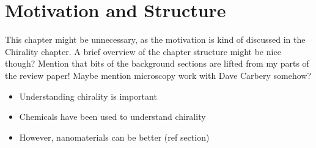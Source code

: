 \chapter{Motivation and Structure}\label{sec:background:Introduction}
\color{red}
This chapter might be unnecessary, as the motivation is kind of discussed in the Chirality chapter. A brief overview of the chapter structure might be nice though?
Mention that bits of the background sections are lifted from my parts of the review paper! Maybe mention microscopy work with Dave Carbery somehow?

\begin{itemize}
    \item Understanding chirality is important
    \item Chemicals have been used to understand chirality
    \item However, nanomaterials can be better (ref section)
\end{itemize}
\color{black}